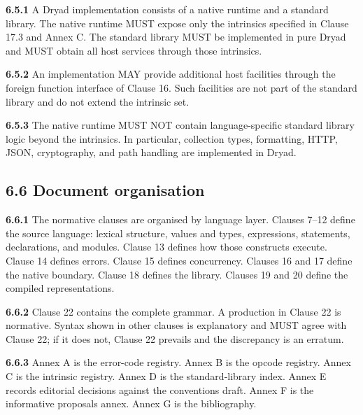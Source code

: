 \documentclass[
  english,
  11pt,
  a4paper,
]{article}
\begin{document}
\textbf{6.5.1} A Dryad implementation consists of a native runtime and a
standard library. The native runtime MUST expose only the intrinsics
specified in Clause 17.3 and Annex C. The standard library MUST be
implemented in pure Dryad and MUST obtain all host services through
those intrinsics.

\textbf{6.5.2} An implementation MAY provide additional host facilities
through the foreign function interface of Clause 16. Such facilities are
not part of the standard library and do not extend the intrinsic set.

\textbf{6.5.3} The native runtime MUST NOT contain language-specific
standard library logic beyond the intrinsics. In particular, collection
types, formatting, HTTP, JSON, cryptography, and path handling are
implemented in Dryad.

\subsection{6.6 Document organisation}\label{document-organisation}

\textbf{6.6.1} The normative clauses are organised by language layer.
Clauses 7--12 define the source language: lexical structure, values and
types, expressions, statements, declarations, and modules. Clause 13
defines how those constructs execute. Clause 14 defines errors. Clause
15 defines concurrency. Clauses 16 and 17 define the native boundary.
Clause 18 defines the library. Clauses 19 and 20 define the compiled
representations.

\textbf{6.6.2} Clause 22 contains the complete grammar. A production in
Clause 22 is normative. Syntax shown in other clauses is explanatory and
MUST agree with Clause 22; if it does not, Clause 22 prevails and the
discrepancy is an erratum.

\textbf{6.6.3} Annex A is the error-code registry. Annex B is the opcode
registry. Annex C is the intrinsic registry. Annex D is the
standard-library index. Annex E records editorial decisions against the
conventions draft. Annex F is the informative proposals annex. Annex G
is the bibliography.
\end{document}
